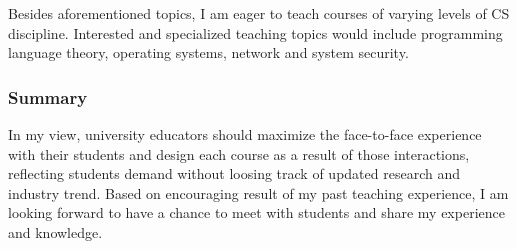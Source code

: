 \documentclass[letterpaper, 10pt]{article}
\begin{document}
\begin{small}
Besides aforementioned topics, I am eager to teach courses of varying levels
of CS discipline. Interested and specialized teaching topics would include
programming language theory, operating systems, network and system
security.

\subsubsection*{Summary}

In my view, university educators should maximize the face-to-face experience
with their students and design each course as a result of those interactions,
reflecting students demand without loosing track of updated research and
industry trend.
%
Based on encouraging result of my past teaching experience, I am looking
forward to have a chance to meet with students and share my experience and
knowledge. 

\end{small}
\end{document}
